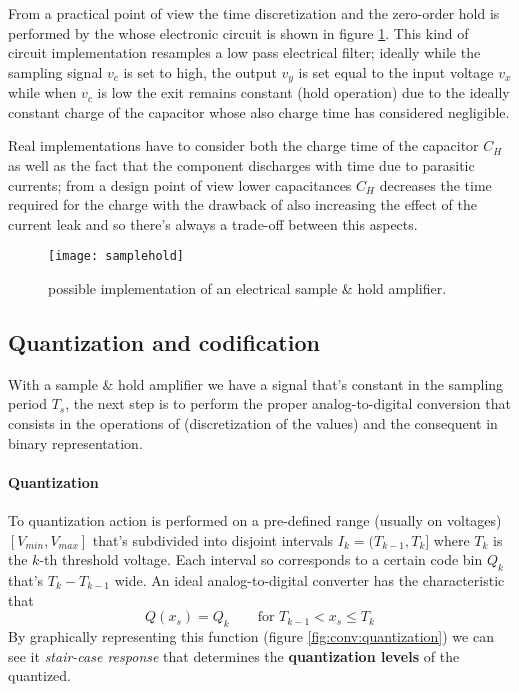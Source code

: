 		
			From a practical point of view the time discretization and the zero-order hold is performed by the  whose electronic circuit is shown in figure \ref{fig:conv:samplehold}.		
			This kind of circuit implementation resamples a low pass electrical filter; ideally while the sampling signal $v_c$ is set to high, the output $v_y$ is set equal to the input voltage $v_x$ while when $v_c$ is low the exit remains constant (hold operation) due to the ideally constant charge of the capacitor whose also charge time has considered negligible.
			
			Real implementations have to consider both the charge time of the capacitor $C_H$ as well as the fact that the component discharges with time due to parasitic currents; from a design point of view lower capacitances $C_H$ decreases the time required for the charge with the drawback of also increasing the effect of the current leak and so there's always a trade-off between this aspects.
		
			\begin{figure}[bh]
				\centering
				\texttt{[image: samplehold]}
				\caption{possible implementation of an electrical sample \& hold amplifier. }
				\label{fig:conv:samplehold}
			\end{figure}
		\subsection{Quantization and codification}
			
			With a sample \& hold amplifier we have a signal that's constant in the sampling period $T_s$, the next step is to perform the proper analog-to-digital conversion that consists in the operations of  (discretization of the values) and the consequent  in binary representation.
			
			\paragraph{Quantization} To quantization action is performed on a pre-defined range (usually on voltages) $[V_{min}, V_{max}]$ that's subdivided into disjoint intervals $I_k = (T_{k-1},T_k]$ where $T_k$ is the $k$-th threshold voltage. Each interval so corresponds to a certain code bin $Q_k$ that's $T_{k}-T_{k-1}$ wide. An ideal analog-to-digital converter has the characteristic that
			\[ Q(x_s) = Q_k \qquad \text{for } T_{k-1} < x_s \leq T_k \]
			By graphically representing this function (figure \ref{fig:conv:quantization}) we can see it \textit{stair-case response} that determines the \textbf{quantization levels} of the quantized.
			
